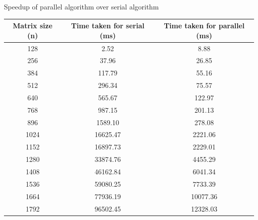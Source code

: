 \documentclass[12pt]{article}
\begin{document}
\begin{section}{Speedup of parallel algorithm over serial algorithm}
 \begin{center}
     \begin{tabular}{|c | c | c|}
         \hline
         \textbf{Matrix size (n)} & \textbf{Time taken for serial (ms)} & \textbf{Time taken for parallel (ms)} \\ [0.5ex]
         \hline
         128                      & 2.52                                & 8.88                                  \\
         \hline
         256                      & 37.96                               & 26.85                                 \\
         \hline
         384                      & 117.79                              & 55.16                                 \\
         \hline
         512                      & 296.34                              & 75.57                                 \\
         \hline
         640                      & 565.67                              & 122.97                                \\
         \hline
         768                      & 987.15                              & 201.13                                \\
         \hline
         896                      & 1589.10                             & 278.08                                \\
         \hline
         1024                     & 16625.47                            & 2221.06                               \\
         \hline
         1152                     & 16897.73                            & 2229.01                               \\
         \hline
         1280                     & 33874.76                            & 4455.29                               \\
         \hline
         1408                     & 46162.84                            & 6041.34                               \\ [1ex]
         \hline
         1536                     & 59080.25                            & 7733.39                               \\ [1ex]
         \hline
         1664                     & 77936.19                            & 10077.36                              \\ [1ex]
         \hline
         1792                     & 96502.45                            & 12328.03                              \\ [1ex]
         \hline
     \end{tabular}
 \end{center}


\end{section}
\end{document}
